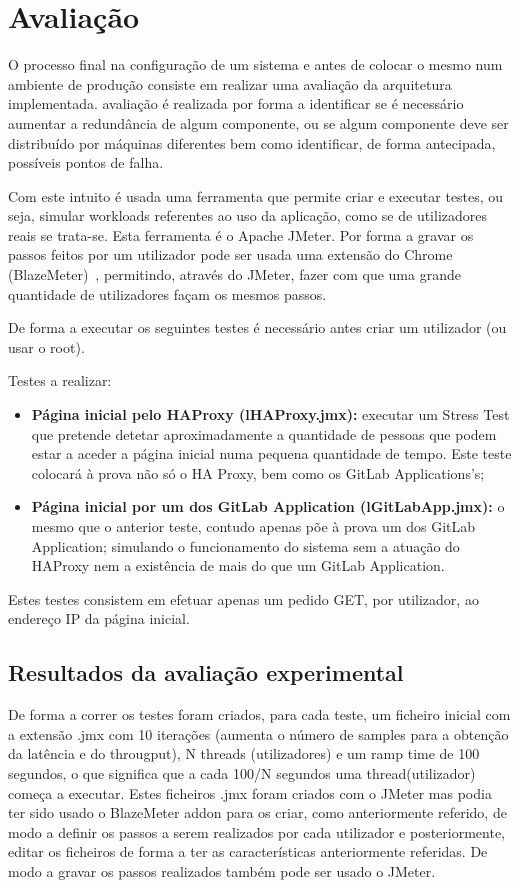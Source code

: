 \documentclass{article}
\begin{document}
\section{Avaliação} \label{Av}

O processo final na configuração de um sistema e antes de colocar o mesmo num ambiente de produção consiste em realizar uma avaliação da arquitetura implementada. 
avaliação é realizada por forma a identificar se é necessário aumentar a redundância de algum componente, ou se algum componente deve ser distribuído por máquinas diferentes bem como identificar, de forma antecipada, possíveis pontos de falha.

Com este intuito é usada uma ferramenta que permite criar e executar testes, ou seja, simular workloads referentes ao uso da aplicação, como se de utilizadores reais se trata-se. Esta ferramenta é o Apache JMeter. Por forma a gravar os passos feitos por um utilizador pode ser usada uma extensão do Chrome (BlazeMeter)~\cite{blazeM}, permitindo, através do JMeter, fazer com que uma grande quantidade de utilizadores façam os mesmos passos.


De forma a executar os seguintes testes é necessário antes criar um utilizador (ou usar o root).

Testes a realizar:~\cite{stressT,stressTest}
\begin{itemize}
    \item \textbf{Página inicial pelo HAProxy (lHAProxy.jmx):} executar um Stress Test que pretende detetar aproximadamente a quantidade de pessoas que podem estar a aceder a página inicial numa pequena quantidade de tempo. Este teste colocará à prova não só o HA Proxy, bem como os GitLab Applications's;
    \item \textbf{Página inicial por um dos GitLab Application (lGitLabApp.jmx):} o mesmo que o anterior teste, contudo apenas põe à prova um dos GitLab Application; simulando o funcionamento do sistema sem a atuação do HAProxy nem a existência de mais do que um GitLab Application.
\end{itemize}

Estes testes consistem em efetuar apenas um pedido GET, por utilizador, ao endereço IP da página inicial.

\subsection{Resultados da avaliação experimental}

De forma a correr os testes foram criados, para cada teste, um ficheiro inicial com a extensão .jmx com 10 iterações (aumenta o número de samples para a obtenção da latência e do througput), N threads (utilizadores) e um ramp time de 100 segundos, o que significa que a cada 100/N segundos uma thread(utilizador) começa a executar. Estes ficheiros .jmx foram criados com o JMeter mas podia ter sido usado o BlazeMeter addon para os criar, como anteriormente referido, de modo a definir os passos a serem realizados por cada utilizador e posteriormente, editar os ficheiros de forma a ter as características anteriormente referidas. De modo a gravar os passos realizados também pode ser usado o JMeter.
\end{document}
